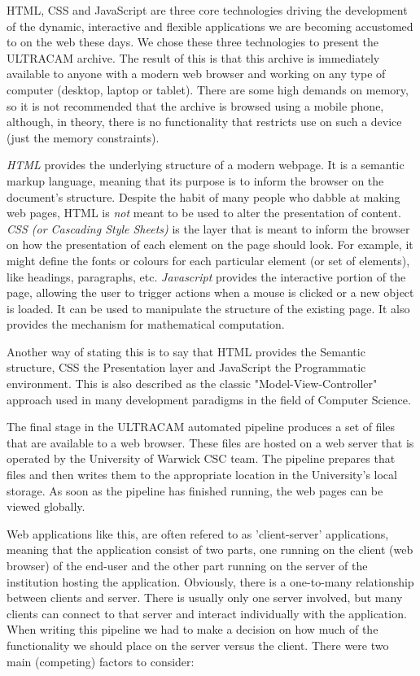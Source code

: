 HTML, CSS and JavaScript are three core technologies driving the development of the dynamic, interactive and flexible applications we are becoming accustomed to on the web these days. We chose these three technologies to present the ULTRACAM archive. The result of this is that this archive is immediately available to anyone with a modern web browser and working on any type of computer (desktop, laptop or tablet). There are some high demands on memory, so it is not recommended that the archive is browsed using a mobile phone, although, in theory, there is no functionality that restricts use on such a device (just the memory constraints). 

\emph{HTML} provides the underlying structure of a modern webpage. It is a semantic markup language, meaning that its purpose is to inform the browser on the document's structure. Despite the habit of many people who dabble at making web pages, HTML is \emph{not} meant to be used to alter the presentation of content. \emph{CSS (or Cascading Style Sheets)} is the layer that is meant to inform the browser on how the presentation of each element on the page should look. For example, it might define the fonts or colours for each particular element (or set of
 elements), like headings, paragraphs, etc. \emph{Javascript} provides the interactive portion of the page, allowing the user to trigger actions when a mouse is
 clicked or a new object is loaded. It can be used to manipulate the structure of the existing page. It also provides the mechanism for mathematical computation.

Another way of stating this is to say that HTML provides the Semantic structure, CSS the Presentation layer and JavaScript the Programmatic environment. This is also described as the classic "Model-View-Controller" approach used in many development paradigms in the field of Computer Science.

The final stage in the ULTRACAM automated pipeline produces a set of files that are available to a web browser. These files are hosted on a web server that is operated by the University of Warwick CSC team. The pipeline prepares that files and then writes them to the appropriate location in the University's local storage. As soon as the pipeline has finished running, the web pages can be viewed globally. 

Web applications like this, are often refered to as 'client-server' applications, meaning that the application consist of two parts, one running on the client (web browser) of the end-user and the other part running on the server of the institution hosting the application. Obviously, there is a one-to-many relationship between clients and server. There is usually only one server involved, but many clients can connect to that server and interact individually with the application. When writing this pipeline we had to make a decision on how much of the functionality we should place on the server versus the client. There were two main (competing) factors to consider:

